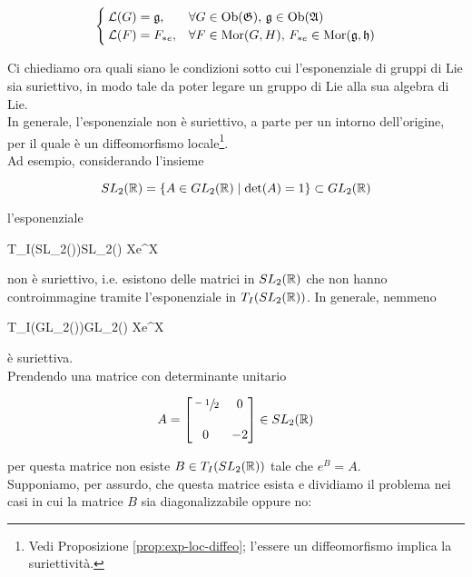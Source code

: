 \begin{equation}
	\begin{cases}
		\mathcal{L}(G) = \mathfrak{g}, & \forall G \in \operatorname{Ob}(\mathfrak{G}), \, \mathfrak{g} \in \operatorname{Ob}(\mathfrak{A}) \\
		\mathcal{L}(F) = F_{*e}, & \forall F \in \operatorname{Mor}(G,H), \, F_{*e} \in \operatorname{Mor}(\mathfrak{g},\mathfrak{h})
	\end{cases}
\end{equation}

Ci chiediamo ora quali siano le condizioni sotto cui l'esponenziale di gruppi di Lie sia suriettivo, in modo tale da poter legare un gruppo di Lie alla sua algebra di Lie.\\
In generale, l'esponenziale non è suriettivo, a parte per un intorno dell'origine, per il quale è un diffeomorfismo locale\footnote{%
	Vedi Proposizione \ref{prop:exp-loc-diffeo}; l'essere un diffeomorfismo implica la suriettività.%
}.\\
Ad esempio, considerando l'insieme

\begin{equation}
	SL_{2}(\mathbb{R}) = \{ A \in GL_{2}(\mathbb{R}) \mid \det(A) = 1 \} \subset GL_{2}(\mathbb{R})
\end{equation}

l'esponenziale

\map{\exp}
	{T_{I}(SL_{2}(\R))}{SL_{2}(\R)}
	{X}{e^{X}}

non è suriettivo, i.e. esistono delle matrici in $ SL_{2}(\mathbb{R}) $ che non hanno controimmagine tramite l'esponenziale in $ T_{I}(SL_{2}(\mathbb{R})) $. In generale, nemmeno

\map{\exp}
	{T_{I}(GL_{2}(\R))}{GL_{2}(\R)}
	{X}{e^{X}}

è suriettiva.\\
Prendendo una matrice con determinante unitario

\begin{equation}
	A = \bmqty{ \sfrac{-1}{2} & 0 \\\\ 0 & -2 } \in SL_{2}(\R)
\end{equation}

per questa matrice non esiste $ B \in T_{I}(SL_{2}(\mathbb{R})) $ tale che $ e^{B} = A $.\\
Supponiamo, per assurdo, che questa matrice esista e dividiamo il problema nei casi in cui la matrice $ B $ sia diagonalizzabile oppure no:

